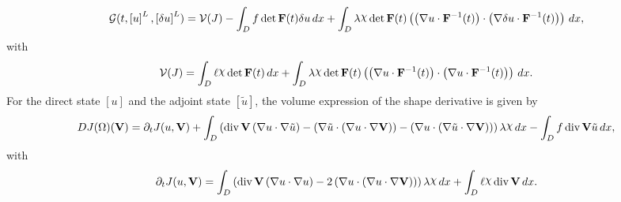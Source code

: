 \documentclass[preview]{standalone}
\let\oldcdot\cdot
\let\cdot\oldcdot
\begin{document}
\begin{dmath*}
\mathcal G(t,\left[ u\right]^{L},\left[ \delta u\right]^{L}) = \mathcal V(J) -  \int_{D} f  \operatorname{det}\mathbf F( t )  \delta u \,dx +  \int_{D} \lambda \raisebox{\depth}{$\chi$}  \operatorname{det}\mathbf F( t )  \left( \left(  \nabla u  \cdot  \mathbf F^{-1}(t) \right) \cdot \left(  \nabla \delta u  \cdot  \mathbf F^{-1}(t) \right) \right) \,dx , 
\end{dmath*}
with
\begin{dmath*}
\mathcal V(J) =  \int_{D} \ell \raisebox{\depth}{$\chi$}  \operatorname{det}\mathbf F( t )  \,dx +  \int_{D} \lambda \raisebox{\depth}{$\chi$}  \operatorname{det}\mathbf F( t )  \left( \left(  \nabla u  \cdot  \mathbf F^{-1}(t) \right) \cdot \left(  \nabla u  \cdot  \mathbf F^{-1}(t) \right) \right) \,dx.
 \end{dmath*}
For the direct state $\left[ u\right]$ and the adjoint state $\left[ \tilde u\right]$, the volume expression of the shape derivative is given by
\begin{dmath*}
DJ(\Omega)(\mathbf V) = \partial_{t} J(u,{\mathbf V}) +  \int_{D} \left(\operatorname{div} {\mathbf V} \left(  \nabla u  \cdot  \nabla \tilde u  \right) - \left(  \nabla \tilde u  \cdot \left(  \nabla u  \cdot  \nabla {\mathbf V}  \right) \right) - \left(  \nabla u  \cdot \left(  \nabla \tilde u  \cdot  \nabla {\mathbf V}  \right) \right)\right) \lambda \raisebox{\depth}{$\chi$} \,dx -  \int_{D} f \operatorname{div} {\mathbf V} \tilde u \,dx , 
\end{dmath*}
with
\begin{dmath*}
\partial_{t} J(u,{\mathbf V}) =  \int_{D} \left(\operatorname{div} {\mathbf V} \left(  \nabla u  \cdot  \nabla u  \right) - 2 \left(  \nabla u  \cdot \left(  \nabla u  \cdot  \nabla {\mathbf V}  \right) \right)\right) \lambda \raisebox{\depth}{$\chi$} \,dx +  \int_{D} \ell \raisebox{\depth}{$\chi$} \operatorname{div} {\mathbf V} \,dx.
 \end{dmath*}
\end{document}
